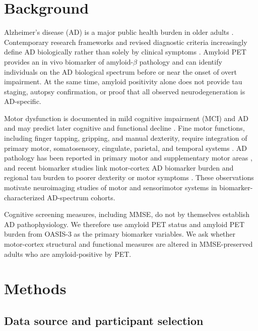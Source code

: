 \documentclass[review,3p,times,12pt,letterpaper]{elsarticle}
\begin{document}
\section{Background}

Alzheimer's disease (AD) is a major public health burden in older adults \cite{alzheimers_facts_2026}. Contemporary research frameworks and revised diagnostic criteria increasingly define AD biologically rather than solely by clinical symptoms \cite{sperling_toward_2011,dubois_preclinical_2016,jack_jr_niaaa_2018,jack_revised_2024}. Amyloid PET provides an in vivo biomarker of amyloid-$\beta$ pathology and can identify individuals on the AD biological spectrum before or near the onset of overt impairment. At the same time, amyloid positivity alone does not provide tau staging, autopsy confirmation, or proof that all observed neurodegeneration is AD-specific.

Motor dysfunction is documented in mild cognitive impairment (MCI) and AD and may predict later cognitive and functional decline \cite{camicioli_motor_1998,watson_executive_2010,wilson_parkinsonianlike_2003,buchman_grip_2007,scarmeas_motor_2005,koppelmans_neural_2022}. Fine motor functions, including finger tapping, gripping, and manual dexterity, require integration of primary motor, somatosensory, cingulate, parietal, and temporal systems \cite{smith_critical_1999,shinohara_effects_2003,frederiksen_age_2006,liou_hand_2020}. AD pathology has been reported in primary motor and supplementary motor areas \cite{arnold_topographical_1991,giannakopoulos_cerebral_1997,suva_primary_1999}, and recent biomarker studies link motor-cortex AD biomarker burden and regional tau burden to poorer dexterity or motor symptoms \cite{gupta_biomarker_dexterity_2024,na_neural_basis_2025}. These observations motivate neuroimaging studies of motor and sensorimotor systems in biomarker-characterized AD-spectrum cohorts.

Cognitive screening measures, including MMSE, do not by themselves establish AD pathophysiology. We therefore use amyloid PET status and amyloid PET burden from OASIS-3 as the primary biomarker variables. We ask whether motor-cortex structural and functional measures are altered in MMSE-preserved adults who are amyloid-positive by PET.

\section{Methods}

\subsection{Data source and participant selection}
\end{document}
